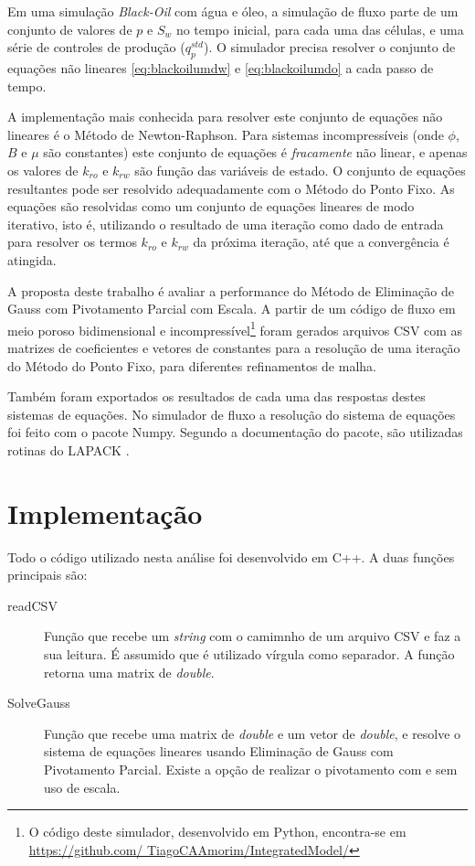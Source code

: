\documentclass[final,5p]{elsarticle}
\numberwithin{equation}{section}
\begin{document}
            Em uma simulação \emph{Black-Oil} com água e óleo, a simulação de fluxo parte de um conjunto de valores de $p$ e $S_w$ no tempo inicial, para cada uma das células, e uma série de controles de produção ($q^{std}_p$). O simulador precisa resolver o conjunto de equações não lineares \ref{eq:blackoilumdw} e \ref{eq:blackoilumdo} a cada passo de tempo.

            A implementação mais conhecida para resolver este conjunto de equações não lineares é o Método de Newton-Raphson. Para sistemas incompressíveis (onde $\phi$, $B$ e $\mu$ são constantes) este conjunto de equações é \emph{fracamente} não linear, e apenas os valores de $k_{ro}$ e $k_{rw}$ são função das variáveis de estado. O conjunto de equações resultantes pode ser resolvido adequadamente com o Método do Ponto Fixo. As equações são resolvidas como um conjunto de equações lineares de modo iterativo, isto é, utilizando o resultado de uma iteração como dado de entrada para resolver os termos $k_{ro}$ e $k_{rw}$ da próxima iteração, até que a convergência é atingida.

            A proposta deste trabalho é avaliar a performance do Método de Eliminação de Gauss com Pivotamento Parcial com Escala. A partir de um código de fluxo em meio poroso bidimensional e incompressível\footnote{O código deste simulador, desenvolvido em Python, encontra-se em \href{https://github.com/TiagoCAAmorim/IntegratedModel/tree/test_matrix}{https://github.com/ TiagoCAAmorim/IntegratedModel/}} foram gerados arquivos CSV com as matrizes de coeficientes e vetores de constantes para a resolução de uma iteração do Método do Ponto Fixo, para diferentes refinamentos de malha.

            Também foram exportados os resultados de cada uma das respostas destes sistemas de equações. No simulador de fluxo a resolução do sistema de equações foi feito com o pacote Numpy. Segundo a documentação do pacote, são utilizadas rotinas do LAPACK \cite{dongarra1992lapack}.

\section{Implementação} \label{sec:implementacao}

        Todo o código utilizado nesta análise foi desenvolvido em C++. A duas funções principais são:

        \begin{description}
            \item[readCSV] Função que recebe um \emph{string} com o camimnho de um arquivo CSV e faz a sua leitura. É assumido que é utilizado vírgula como separador. A função retorna uma matrix de \emph{double}.
            \item[SolveGauss] Função que recebe uma matrix de \emph{double} e um vetor de \emph{double}, e resolve o sistema de equações lineares usando Eliminação de Gauss com Pivotamento Parcial. Existe a opção de realizar o pivotamento com e sem uso de escala.
        \end{description}
\end{document}
